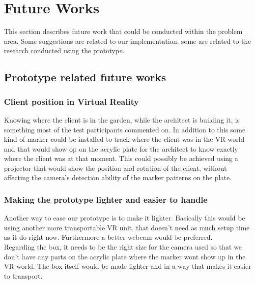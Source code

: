 \chapter{Future Works}
This section describes future work that could be conducted within the problem area. Some suggestions are related to our implementation, some are related to the research conducted using the prototype.
\section{Prototype related future works}

\subsection*{Client position in Virtual Reality}
Knowing where the client is in the garden, while the architect is building it, is something most of the test participants commented on. In addition to this some kind of marker could be installed to track where the client was in the VR world and that would show op on the acrylic plate for the architect to know exactly where the client was at that moment. This could possibly be achieved using a projector that would show the position and rotation of the client, without affecting the camera's detection ability of the marker patterns on the plate.

\subsection*{Making the prototype lighter and easier to handle}
Another way to ease our prototype is to make it lighter. Basically this would be using another more transportable VR unit, that doesn't need as much setup time as it do right now. Furthermore a better webcam would be preferred.\\
Regarding the box, it needs to be the right size for the camera used so that we don't have any parts on the acrylic plate where the marker wont show up in the VR world. The box itself would be made lighter and in a way that makes it easier to transport.

